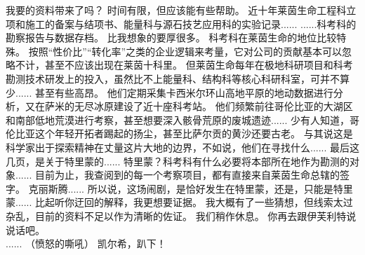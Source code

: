 \documentclass[openany]{book}
\begin{document}
\begin{dialogue}
     我要的资料带来了吗？
     时间有限，但应该能有些帮助。
     近十年莱茵生命工程科立项和施工的备案与结项书、能量科与源石技艺应用科的实验记录......
     ......科考科的勘察报告与数据存档。
     比我想象的要厚很多。
     科考科在莱茵生命的地位比较特殊。
     按照“性价比”“转化率”之类的企业逻辑来考量，它对公司的贡献基本可以忽略不计，甚至不应该出现在莱茵十科里。
     但莱茵生命每年在极地科研项目和科考勘测技术研发上的投入，虽然比不上能量科、结构科等核心科研科室，可并不算少......
     甚至有些高昂。
     他们定期采集卡西米尔环山高地平原的地动数据进行分析，又在萨米的无尽冰原建设了近十座科考站。
     他们频繁前往哥伦比亚的大湖区和南部低地荒漠进行考察，甚至想要深入骸骨荒原的废城遗迹......
     少有人知道，哥伦比亚这个年轻开拓者踢起的扬尘，甚至比萨尔贡的黄沙还要古老。
     与其说这是科学家出于探索精神在丈量这片大地的边界，不如说，他们在寻找什么......
     最后这几页，是关于特里蒙的......
     特里蒙？科考科有什么必要将本部所在地作为勘测的对象......
     目前为止，我查阅到的每一个考察项目，都有直接来自莱茵生命总辖的签字。
     克丽斯腾......
     所以说，这场闹剧，是恰好发生在特里蒙，还是，只能是特里蒙......
     比起听你迂回的解释，我更想要证据。
     我大概有了一些猜想，但线索太过杂乱，目前的资料不足以作为清晰的佐证。
     我们稍作休息。
     你再去跟伊芙利特说说话吧。
    \\
     ......
     （愤怒的嘶吼）
     凯尔希，趴下！
\end{dialogue}
\end{document}
